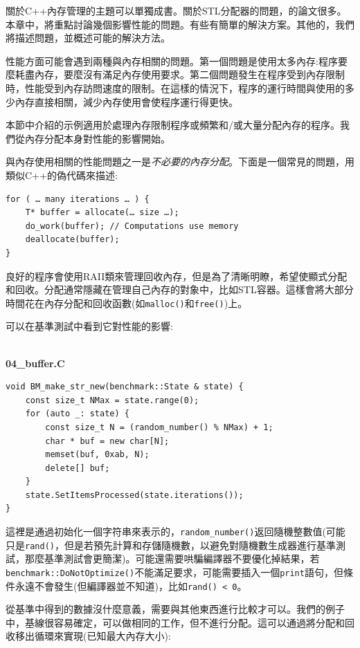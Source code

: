 
關於C++內存管理的主題可以單獨成書。關於STL分配器的問題，的論文很多。本章中，將重點討論幾個影響性能的問題。有些有簡單的解決方案。其他的，我們將描述問題，並概述可能的解決方法。 

性能方面可能會遇到兩種與內存相關的問題。第一個問題是使用太多內存:程序要麼耗盡內存，要麼沒有滿足內存使用要求。第二個問題發生在程序受到內存限制時，性能受到內存訪問速度的限制。在這樣的情況下，程序的運行時間與使用的多少內存直接相關，減少內存使用會使程序運行得更快。 

本節中介紹的示例適用於處理內存限制程序或頻繁和/或大量分配內存的程序。我們從內存分配本身對性能的影響開始。


與內存使用相關的性能問題之一是\textit{不必要的內存分配}。下面是一個常見的問題，用類似C++的偽代碼來描述:

\begin{lstlisting}[style=styleCXX]
for ( … many iterations … ) {
	T* buffer = allocate(… size …);
	do_work(buffer); // Computations use memory
	deallocate(buffer);
}
\end{lstlisting}

良好的程序會使用RAII類來管理回收內存，但是為了清晰明瞭，希望使顯式分配和回收。分配通常隱藏在管理自己內存的對象中，比如STL容器。這樣會將大部分時間花在內存分配和回收函數(如\texttt{malloc()}和\texttt{free()})上。 

可以在基準測試中看到它對性能的影響:

\hspace*{\fill} \\ %
\noindent
\textbf{04\_buffer.C}
\begin{lstlisting}[style=styleCXX]
void BM_make_str_new(benchmark::State & state) {
	const size_t NMax = state.range(0);
	for (auto _: state) {
		const size_t N = (random_number() % NMax) + 1;
		char * buf = new char[N];
		memset(buf, 0xab, N);
		delete[] buf;
	}
	state.SetItemsProcessed(state.iterations());
}
\end{lstlisting}

這裡是通過初始化一個字符串來表示的，\texttt{random\_number()}返回隨機整數值(可能只是\texttt{rand()}，但是若預先計算和存儲隨機數，以避免對隨機數生成器進行基準測試，那麼基準測試會更簡潔)。可能還需要哄騙編譯器不要優化掉結果，若\texttt{benchmark::DoNotOptimize()}不能滿足要求，可能需要插入一個\texttt{print}語句，但條件永遠不會發生(但編譯器並不知道)，比如\texttt{rand() < 0}。

從基準中得到的數據沒什麼意義，需要與其他東西進行比較才可以。我們的例子中，基線很容易確定，可以做相同的工作，但不進行分配。這可以通過將分配和回收移出循環來實現(已知最大內存大小):


